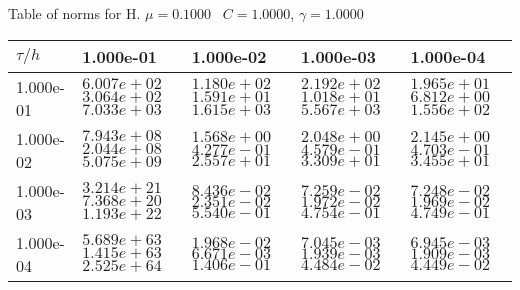 \begin{center}
Table of norms for H. $\mu = 0.1000$ \, $C = 1.0000$, $\gamma = 1.0000$
  
\begin{tabular}{|p{1in}|p{1in}|p{1in}|p{1in}|p{1in}|} \hline
$\tau / h$ &1.000e-01 &1.000e-02 &1.000e-03 &1.000e-04 \\ \hline 
1.000e-01 & $6.007e+02$  $3.064e+02$  $7.033e+03$  & $1.180e+02$  $1.591e+01$  $1.615e+03$  & $2.192e+02$  $1.018e+01$  $5.567e+03$  & $1.965e+01$  $6.812e+00$  $1.556e+02$  \\ \hline 
1.000e-02 & $7.943e+08$  $2.044e+08$  $5.075e+09$  & $1.568e+00$  $4.277e-01$  $2.557e+01$  & $2.048e+00$  $4.579e-01$  $3.309e+01$  & $2.145e+00$  $4.703e-01$  $3.455e+01$  \\ \hline 
1.000e-03 & $3.214e+21$  $7.368e+20$  $1.193e+22$  & $8.436e-02$  $2.351e-02$  $5.540e-01$  & $7.259e-02$  $1.972e-02$  $4.754e-01$  & $7.248e-02$  $1.969e-02$  $4.749e-01$  \\ \hline 
1.000e-04 & $5.689e+63$  $1.415e+63$  $2.525e+64$  & $1.968e-02$  $6.671e-03$  $1.406e-01$  & $7.045e-03$  $1.939e-03$  $4.484e-02$  & $6.945e-03$  $1.909e-03$  $4.449e-02$  \\ \hline 

\end{tabular}\\[20pt]
\end{center}

